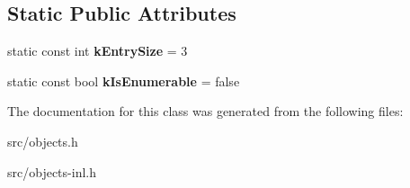 \subsection*{Static Public Attributes}
\begin{DoxyCompactItemize}
\item 
\hypertarget{classv8_1_1internal_1_1_number_dictionary_shape_a9076ec00745caf9bf124186dff62ea96}{}static const int {\bfseries k\+Entry\+Size} = 3\label{classv8_1_1internal_1_1_number_dictionary_shape_a9076ec00745caf9bf124186dff62ea96}

\item 
\hypertarget{classv8_1_1internal_1_1_number_dictionary_shape_a2286539ca5d3e61f5fddfb1c5f44a7cd}{}static const bool {\bfseries k\+Is\+Enumerable} = false\label{classv8_1_1internal_1_1_number_dictionary_shape_a2286539ca5d3e61f5fddfb1c5f44a7cd}

\end{DoxyCompactItemize}


The documentation for this class was generated from the following files\+:\begin{DoxyCompactItemize}
\item 
src/objects.\+h\item 
src/objects-\/inl.\+h\end{DoxyCompactItemize}
